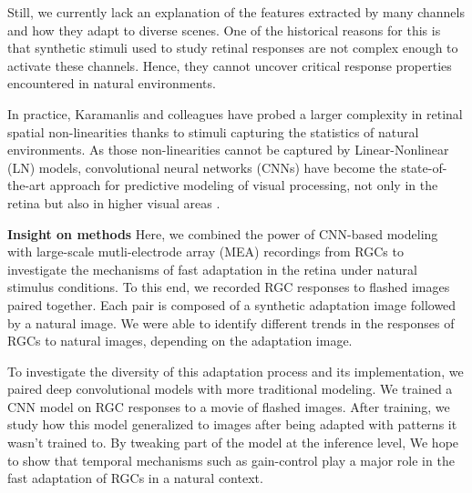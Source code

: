 Still, we currently lack an explanation of the features extracted by many
channels and how they adapt to diverse scenes. One of the historical
reasons for this is that synthetic stimuli used
to study retinal responses are not complex enough to activate these channels.
Hence, they cannot uncover critical response properties encountered in natural
environments. %

In practice, Karamanlis and colleagues \citep{kim_nonlinear_2020} have
probed a larger complexity in retinal spatial non-linearities thanks to stimuli
capturing the statistics of natural environments.
As those non-linearities cannot be captured by Linear-Nonlinear (LN) models,
convolutional neural networks (CNNs) have become the state-of-the-art approach
for predictive modeling of visual processing, not only in the retina but also
in higher visual areas \citep{mcintosh_deep_2017}.

\textbf{Insight on methods}
Here, we combined the power of CNN-based modeling with large-scale
mutli-electrode array (MEA) recordings from RGCs to investigate the mechanisms
of fast
adaptation in the retina under natural stimulus conditions. To this end, we
recorded RGC responses to flashed images paired together. Each pair is composed
of a synthetic adaptation image followed by a natural image. We were able to
identify different trends in the responses of RGCs to natural images, depending
on the adaptation image. %

To investigate the diversity of this adaptation process and its implementation,
we paired deep convolutional models with more traditional modeling. We trained
a CNN model on RGC responses to a movie of flashed images. After training, we
study how this model generalized to images after being adapted with
patterns it wasn't trained to. By tweaking part of the model at the inference
level, We hope to show that temporal mechanisms such as gain-control play a
major role in the fast adaptation of RGCs in a natural context.
